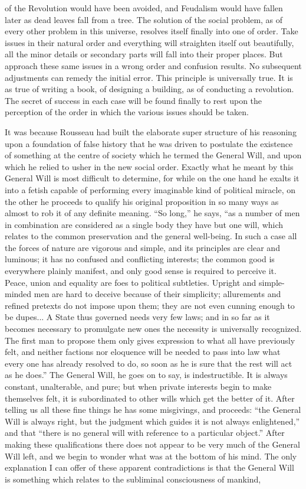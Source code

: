 \documentclass{book}
\begin{document}
of the Revolution would have been avoided, and Feudalism would have fallen later as dead leaves fall from a tree. The solution of the social problem, as of every other problem in this universe, resolves itself finally into one of order. Take issues in their natural order and everything will straighten itself out beautifully, all the minor details or secondary parts will fall into their proper places. But approach these same issues in a wrong order and confusion results. No subsequent adjustments can remedy the initial error. This principle is universally true. It is as true of writing a book, of designing a building, as of conducting a revolution. The secret of success in each case will be found finally to rest upon the perception of the order in which the various issues should be taken.

It was because Rousseau had built the elaborate super structure of his reasoning upon a foundation of false history that he was driven to postulate the existence of something at the centre of society which he termed the General Will, and upon which he relied to usher in the new social order. Exactly what he meant by this General Will is most difficult to determine, for while on the one hand he exalts it into a fetish capable of performing every imaginable kind of political miracle, on the other he proceeds to qualify his original proposition in so many ways as almost to rob it of any definite meaning. “So long,” he says, “as a number of men in combination are considered as a single body they have but one will, which relates to the common preservation and the general well-being. In such a case all the forces of nature are vigorous and simple, and its principles are clear and luminous; it has no confused and conflicting interests; the common good is everywhere plainly manifest, and only good sense is required to perceive it. Peace, union and equality are foes to political subtleties. Upright and simple-minded men are hard to deceive because of their simplicity; allurements and refined pretexts do not impose upon them; they are not even cunning enough to be dupes... A State thus governed needs very few laws; and in so far as it becomes necessary to promulgate new ones the necessity is universally recognized. The first man to propose them only gives expression to what all have previously felt, and neither factions nor eloquence will be needed to pass into law what every one has already resolved to do, so soon as he is sure that the rest will act as he does.” The General Will, he goes on to say, is indestructible. It is always constant, unalterable, and pure; but when private interests begin to make themselves felt, it is subordinated to other wills which get the better of it. After telling us all these fine things he has some misgivings, and proceeds: “the General Will is always right, but the judgment which guides it is not always enlightened,” and that “there is no general will with reference to a particular object.” After making these qualifications there does not appear to be very much of the General Will left, and we begin to wonder what was at the bottom of his mind. The only explanation I can offer of these apparent contradictions is that the General Will is something which relates to the subliminal consciousness of mankind, 
\end{document}
